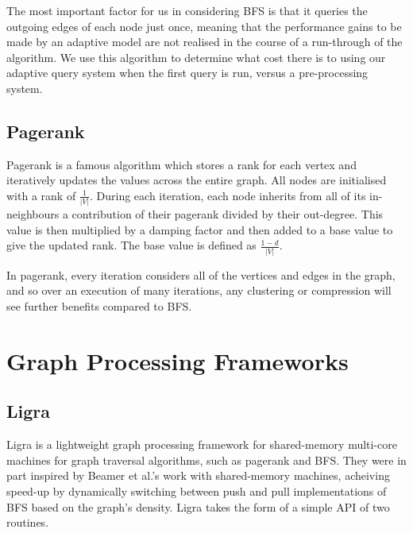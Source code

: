 The most important factor for us in considering BFS is that it queries the outgoing edges of each
node just once, meaning that the performance gains to be made by an adaptive model are not realised
in the course of a run-through of the algorithm. We use this algorithm to determine what cost there
is to using our adaptive query system when the first query is run, versus a pre-processing system.

\subsection{Pagerank}

Pagerank is a famous algorithm which stores a rank for each vertex and iteratively updates the values
across the entire graph. All nodes are initialised with a rank of $\frac{1}{|V|}$. During each
iteration, each node inherits from all of its in-neighbours a contribution of their pagerank divided
by their out-degree. This value is then multiplied by a damping factor and then added to a base value
to give the updated rank. The base value is defined as $\frac{1 - d}{|V|}$.

In pagerank, every iteration considers all of the vertices and edges in the graph, and so over
an execution of many iterations, any clustering or compression will see further benefits compared to
BFS.

\section{Graph Processing Frameworks}

\subsection{Ligra}

Ligra is a lightweight graph processing framework for shared-memory multi-core machines for graph
traversal algorithms, such as pagerank and BFS. They were in part inspired by Beamer et al.'s work
with shared-memory machines, acheiving speed-up by dynamically switching between push and pull implementations of BFS based on the graph's density. Ligra takes the form of a simple API of two
routines.

